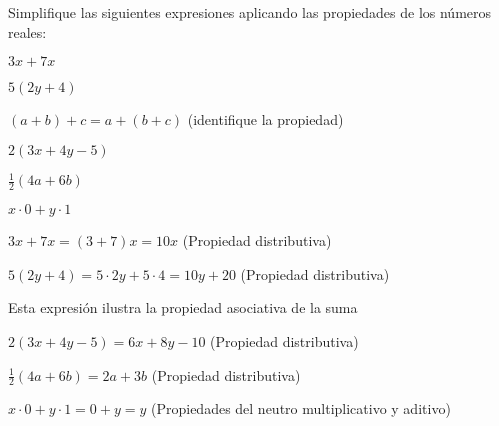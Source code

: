 \begin{exercise}
\problem Simplifique las siguientes expresiones aplicando las propiedades de los números reales:

\begin{exerciselist}
    \item $3x + 7x$
    \item $5(2y + 4)$
    \item $(a + b) + c = a + (b + c)$ (identifique la propiedad)
    \item $2(3x + 4y - 5)$
    \item $\frac{1}{2}(4a + 6b)$
    \item $x \cdot 0 + y \cdot 1$
\end{exerciselist}

\begin{solucion}
\begin{exerciselist}
    \item $3x + 7x = (3 + 7)x = 10x$ (Propiedad distributiva)
    \item $5(2y + 4) = 5 \cdot 2y + 5 \cdot 4 = 10y + 20$ (Propiedad distributiva)
    \item Esta expresión ilustra la propiedad asociativa de la suma
    \item $2(3x + 4y - 5) = 6x + 8y - 10$ (Propiedad distributiva)
    \item $\frac{1}{2}(4a + 6b) = 2a + 3b$ (Propiedad distributiva)
    \item $x \cdot 0 + y \cdot 1 = 0 + y = y$ (Propiedades del neutro multiplicativo y aditivo)
\end{exerciselist}
\end{solucion}
\end{exercise}

